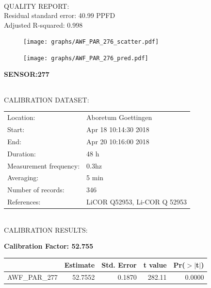\documentclass[oneside]{report}
\begin{document}
\hrulefill\\
QUALITY REPORT:\\
Residual standard error: 40.99 PPFD\\
Adjusted R-squared: 0.998



\begin{figure}[H]
  \centering
  \texttt{[image: graphs/AWF\_PAR\_276\_scatter.pdf]}
\end{figure}




\begin{figure}[H]
  \centering
  \texttt{[image: graphs/AWF\_PAR\_276\_pred.pdf]}
\end{figure}

\pagebreak


\begin{center}
\large{\textbf{SENSOR:277}}\\
\end{center}

\hrulefill\\
CALIBRATION DATASET:\\
\begin{table}[h!]
  \centering
  \label{tab:table1}
  \begin{tabular}{ll}
    Location: & Aboretum Goettingen\\ 
    
    
    Start:  & Apr 18 10:14:30 2018 \\
    End:   & Apr 20 10:16:00 2018\\ 
    Duration: & 48 h\\
    Measurement frequency: & 0.3hz\\
    Averaging:  &5 min\\
    Number of records: & 346 \\
    References: & LiCOR Q52953, Li-COR Q 52953 \\
  \end{tabular}
\end{table}

\hrulefill\\
CALIBRATION RESULTS:\\


\begin{center}
\textbf{\large{Calibration Factor: 52.755}}\\
\end{center}
\begin{table}[ht]
\centering
\begin{tabular}{rrrrr}
  \hline
 & Estimate & Std. Error & t value & Pr($>$$|$t$|$) \\ 
  \hline
AWF\_PAR\_277 & 52.7552 & 0.1870 & 282.11 & 0.0000 \\ 
   \hline
\end{tabular}
\end{table}
\end{document}
